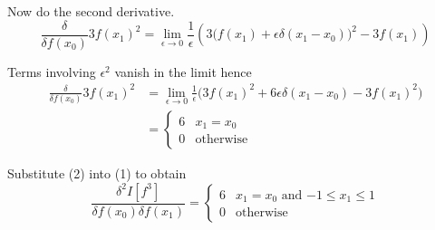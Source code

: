 \documentclass[12pt]{article}
\begin{document}
Now do the second derivative.
\begin{equation*}
\frac{\delta}{\delta f(x_0)}3f(x_1)^2
=\lim_{\epsilon\rightarrow0}\frac{1}{\epsilon}
\left(
3\big(f(x_1)+\epsilon\delta(x_1-x_0)\big)^2-3f(x_1)
\right)
\end{equation*}

Terms involving $\epsilon^2$ vanish in the limit hence
\begin{align*}
\frac{\delta}{\delta f(x_0)}3f(x_1)^2
&=\lim_{\epsilon\rightarrow0}\frac{1}{\epsilon}
\big(
3f(x_1)^2+6\epsilon\delta(x_1-x_0)-3f(x_1)^2
\big)
\\
&=\begin{cases}
6 & x_1=x_0
\\
0 & \text{otherwise}
\end{cases}
\tag{2}
\end{align*}

Substitute (2) into (1) to obtain
\begin{equation*}
\frac{\delta^2 I[f^3]}{\delta f(x_0)\delta f(x_1)}
=\begin{cases}
6 & \text{$x_1=x_0$ and $-1\le x_1\le1$}
\\
0 & \text{otherwise}
\end{cases}
\end{equation*}
\end{document}

